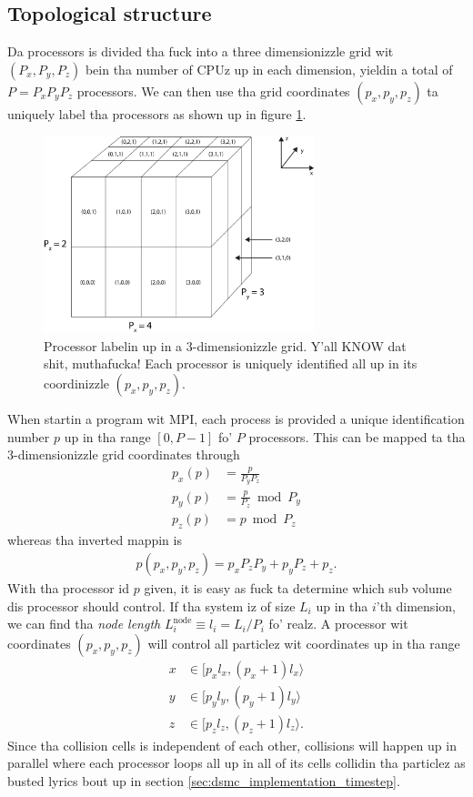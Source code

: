 \subsection{Topological structure}
Da processors is divided tha fuck into a three dimensionizzle grid wit $(P_x, P_y, P_z)$ bein tha number of CPUz up in each dimension, yieldin a total of $P = P_xP_yP_z$ processors. We can then use tha grid coordinates $(p_x, p_y, p_z)$ ta uniquely label tha processors as shown up in figure \ref{fig:dsmc_parallelization_2}.
\begin{figure}[htpb]
\begin{center}
\includegraphics[width=0.7\textwidth, trim=0cm 0cm 0cm 0cm, clip]{DSMC/figures/parallelization_node_configuration.eps}
\end{center}
\caption{Processor labelin up in a 3-dimensionizzle grid. Y'all KNOW dat shit, muthafucka! Each processor is uniquely identified all up in its coordinizzle $(p_x, p_y, p_z)$.}
\label{fig:dsmc_parallelization_2}
\end{figure}
When startin a program wit MPI, each process is provided a unique identification number $p$ up in tha range $[0, P-1]$ fo' $P$ processors. This can be mapped ta tha 3-dimensionizzle grid coordinates through
\begin{align}
	\nonumber
	p_x(p) &= \frac{p }{ P_yP_z}\\
	\nonumber
	p_y(p) &= \frac{p }{ P_z} \bmod P_y\\
	p_z(p) &= p \bmod P_z
\end{align}
whereas tha inverted mappin is 
\begin{align}
	p(p_x, p_y, p_z) = p_xP_zP_y + p_yP_z + p_z.
\end{align}
With tha processor id $p$ given, it is easy as fuck  ta determine which sub volume dis processor should control. If tha system iz of size $L_i$ up in tha $i$'th dimension, we can find tha \textit{node length} $L_i^{\text{node}} \equiv l_i = L_i/P_i$ fo' realz. A processor wit coordinates $(p_x, p_y, p_z)$ will control all particlez wit coordinates up in tha range
\begin{align}
	\nonumber
	x&\in[p_xl_x, (p_x+1)l_x\rangle\\
	\nonumber
	y&\in[p_yl_y, (p_y+1)l_y\rangle\\
	z&\in[p_zl_z, (p_z+1)l_z\rangle.
\end{align}
Since tha collision cells is independent of each other, collisions will happen up in parallel where each processor loops all up in all of its cells collidin tha particlez as busted lyrics bout up in section \ref{sec:dsmc_implementation_timestep}. 
